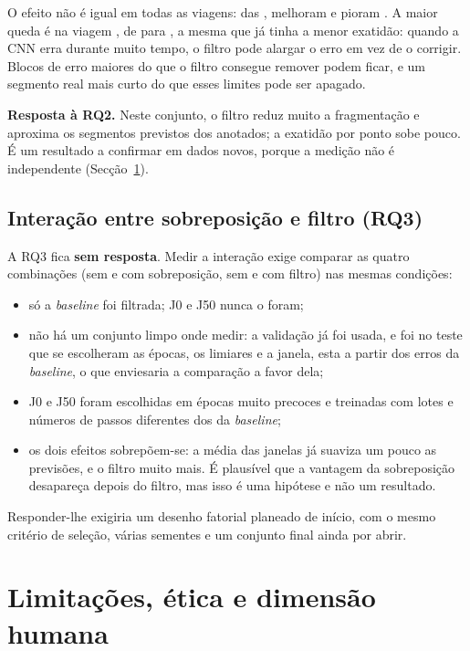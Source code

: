 \documentclass{article}
\begin{document}
O efeito não é igual em todas as viagens: das \resPpNViagens{}, melhoram \resPpViagMelhoram{} e pioram \resPpViagPioram{}. A maior queda é na viagem \resPpPiorQuedaViagem{}, de \resPpPiorQuedaAntes{} para \resPpPiorQuedaDepois{}, a mesma que já tinha a menor exatidão: quando a CNN erra durante muito tempo, o filtro pode alargar o erro em vez de o corrigir. Blocos de erro maiores do que o filtro consegue remover podem ficar, e um segmento real mais curto do que esses limites pode ser apagado.

\textbf{Resposta à RQ2.} Neste conjunto, o filtro reduz muito a fragmentação e aproxima os segmentos previstos dos anotados; a exatidão por ponto sobe pouco. É um resultado a confirmar em dados novos, porque a medição não é independente (Secção~\ref{sec:limitacoes}).

\subsection{Interação entre sobreposição e filtro (RQ3)}
\label{sec:rq3}

A RQ3 fica \textbf{sem resposta}. Medir a interação exige comparar as quatro combinações (sem e com sobreposição, sem e com filtro) nas mesmas condições:
\begin{itemize}
\item só a \emph{baseline} foi filtrada; J0 e J50 nunca o foram;
\item não há um conjunto limpo onde medir: a validação já foi usada, e foi no teste que se escolheram as épocas, os limiares e a janela, esta a partir dos erros da \emph{baseline}, o que enviesaria a comparação a favor dela;
\item J0 e J50 foram escolhidas em épocas muito precoces e treinadas com lotes e números de passos diferentes dos da \emph{baseline};
\item os dois efeitos sobrepõem-se: a média das janelas já suaviza um pouco as previsões, e o filtro muito mais. É plausível que a vantagem da sobreposição desapareça depois do filtro, mas isso é uma hipótese e não um resultado.
\end{itemize}
Responder-lhe exigiria um desenho fatorial planeado de início, com o mesmo critério de seleção, várias sementes e um conjunto final ainda por abrir.

\section{Limitações, ética e dimensão humana}
\label{sec:limitacoes}
\end{document}

